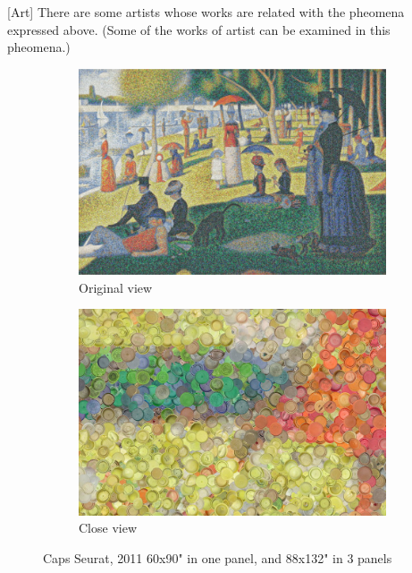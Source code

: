 [Art] There are some artists whose works are related with the pheomena expressed above. (Some of the works of artist can be examined in this pheomena.)


\begin{figure}[h!]
\centering
\begin{subfigure}{.47\textwidth}
  \centering
  \includegraphics[width=\linewidth]{graphics/ChrisJordan_Numbers_OriginalView.jpg}
  \caption{Original view}
  \label{fig:ChrisJordan_Numbers_CloseView}
\end{subfigure}
\hfill
\begin{subfigure}{.47\textwidth}
  \centering
  \includegraphics[width=\linewidth]{graphics/ChrisJordan_Numbers_CloseView.jpg}
  \caption{Close view}
  \label{fig:ChrisJordan_Numbers_OriginalView}
\end{subfigure}
\caption{Caps Seurat, 2011 60x90" in one panel, and 88x132" in 3 panels}
\label{fig:ChrisJordan_Numbers_CapsSeurat}
\end{figure}

